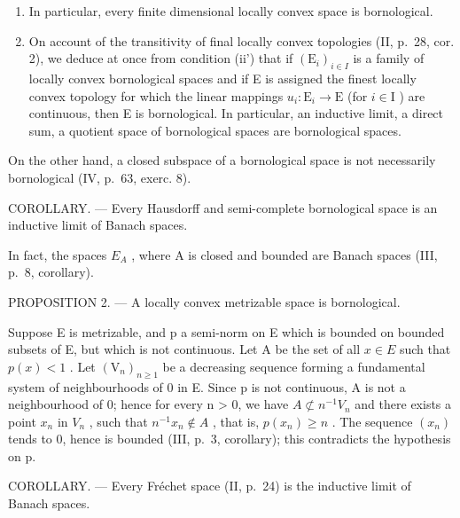 \begin{enumerate}
\def\labelenumi{\arabic{enumi})}
\setcounter{enumi}{1}
\item
  In particular, every finite dimensional locally convex space is bornological.
\item
  On account of the transitivity of final locally convex topologies (II, p.~28, cor. 2), we deduce at once from condition (ii') that if \((\mathrm{E}_i)_{i\in I}\) is a family of locally convex bornological spaces and if E is assigned the finest locally convex topology for which the linear mappings \(u_{i}:\mathrm{E}_{i}\to \mathrm{E}\) (for \(i\in \mathrm{I}\) ) are continuous, then E is bornological. In particular, an inductive limit, a direct sum, a quotient space of bornological spaces are bornological spaces.
\end{enumerate}

On the other hand, a closed subspace of a bornological space is not necessarily bornological (IV, p.~63, exerc. 8).

COROLLARY. --- Every Hausdorff and semi-complete bornological space is an inductive limit of Banach spaces.

In fact, the spaces \(E_{A}\) , where A is closed and bounded are Banach spaces (III, p.~8, corollary).

PROPOSITION 2. --- A locally convex metrizable space is bornological.

Suppose E is metrizable, and p a semi-norm on E which is bounded on bounded subsets of E, but which is not continuous. Let A be the set of all \(x \in E\) such that \(p(x) < 1\) . Let \((\mathrm{V}_{n})_{n \geqslant 1}\) be a decreasing sequence forming a fundamental system of neighbourhoods of 0 in E. Since p is not continuous, A is not a neighbourhood of 0; hence for every n \textgreater{} 0, we have \(A \not\subset n^{-1}V_{n}\) and there exists a point \(x_{n}\) in \(V_{n}\) , such that \(n^{-1}x_{n} \notin A\) , that is, \(p(x_{n}) \geqslant n\) . The sequence \((x_{n})\) tends to 0, hence is bounded (III, p.~3, corollary); this contradicts the hypothesis on p.

COROLLARY. --- Every Fréchet space (II, p.~24) is the inductive limit of Banach spaces.

